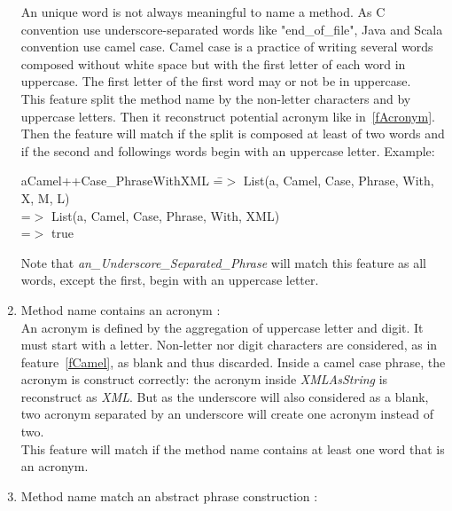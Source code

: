 \documentclass[12pt]{article}
\newcommand{\code}[1]{{\fontfamily{phv}\selectfont \small{\begin{tabbing} #1 \end{tabbing}}}}
\begin{document}
\begin{enumerate}
	An unique word is not always meaningful to name a method. As C convention use underscore-separated words like "end\_of\_file", Java and Scala convention use camel case. Camel case is a practice of writing several words composed without white space but with the first letter of each word in uppercase. The first letter of the first word may or not be in uppercase.\\
This feature split the method name by the non-letter characters and by uppercase letters. Then it reconstruct potential acronym like in~\ref{fAcronym}. Then the feature will match if the split is composed at least of two words and if the second and followings words begin with an uppercase letter. Example:
\code{aCamel++Case\_PhraseWithXML \= =$>$ List(a, Camel, Case, Phrase, With, X, M, L)\\
\>=$>$ List(a, Camel, Case, Phrase, With, XML)\\
\>=$>$ true
}
Note that \textit{an\_Underscore\_Separated\_Phrase} will match this feature as all words, except the first, begin with an uppercase letter.
\item Method name contains an acronym :\label{fAcronym}\\
	An acronym is defined by the aggregation of uppercase letter and digit. It must start with a letter. Non-letter nor digit characters are considered, as in feature~\ref{fCamel}, as blank and thus discarded. Inside a camel case phrase, the acronym is construct correctly: the acronym inside \textit{XMLAsString} is reconstruct as \textit{XML}. But as the underscore will also considered as a blank, two acronym separated by an underscore will create one acronym instead of two.\\
This feature will match if the method name contains at least one word that is an acronym.
\item Method name match an abstract phrase construction : \\


\end{enumerate}
\end{document}
